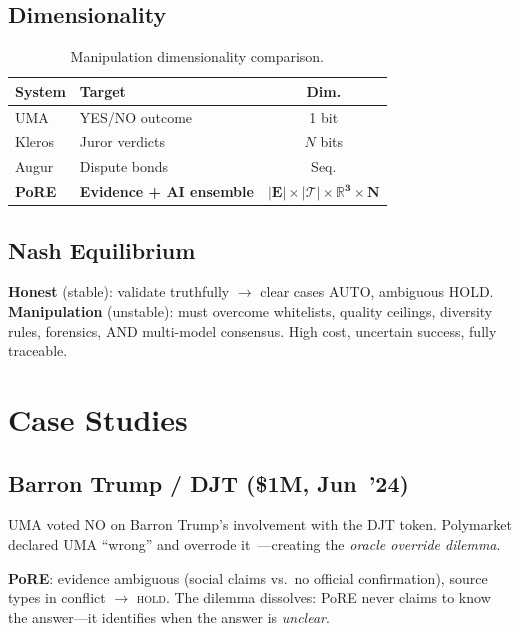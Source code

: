 \documentclass[11pt,a4paper,twocolumn]{article}
\begin{document}
\subsection{Dimensionality}

\begin{table}[H]
\centering
\caption{Manipulation dimensionality comparison.}
\label{tab:dim}
\scriptsize
\begin{tabularx}{\columnwidth}{@{}lXc@{}}
\toprule
\textbf{System} & \textbf{Target} & \textbf{Dim.} \\
\midrule
UMA & YES/NO outcome & 1 bit \\
Kleros & Juror verdicts & $N$ bits \\
Augur & Dispute bonds & Seq. \\
\textbf{PoRE} & \textbf{Evidence + AI ensemble} & $\mathbf{|E| \!\times\! |\mathcal{T}| \!\times\! \mathbb{R}^3 \!\times\! N}$ \\
\bottomrule
\end{tabularx}
\end{table}

\subsection{Nash Equilibrium}

\textbf{Honest} (stable): validate truthfully $\to$ clear cases AUTO, ambiguous HOLD. \textbf{Manipulation} (unstable): must overcome whitelists, quality ceilings, diversity rules, forensics, AND multi-model consensus. High cost, uncertain success, fully traceable.

\section{Case Studies}

\subsection{Barron Trump / DJT (\$1M, Jun~'24)}

UMA voted NO on Barron Trump's involvement with the DJT token. Polymarket declared UMA ``wrong'' and overrode it~\cite{reynolds2024}---creating the \emph{oracle override dilemma}.

\textbf{PoRE}: evidence ambiguous (social claims vs.\ no official confirmation), source types in conflict $\to$ \textsc{hold}. The dilemma dissolves: PoRE never claims to know the answer---it identifies when the answer is \emph{unclear}.
\end{document}
